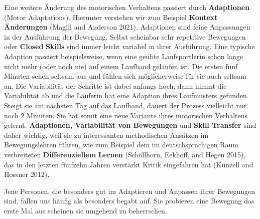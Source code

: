 \documentclass[
  letterpaper,
  DIV=11,
  numbers=noendperiod]{scrreprt}
\begin{document}
Eine weitere Änderung des motorischen Verhaltens passiert durch
\textbf{Adaptionen} (Motor Adaptations). Hierunter verstehen wir zum
Beispiel \textbf{Kontext} \textbf{Änderungen} (Magill and Anderson
2021). Adaptionen sind feine Anpassungen in der Ausführung der Bewegung.
Selbst scheinbar sehr repetitive Bewegungen oder \textbf{Closed}
\textbf{Skills} sind immer leicht variabel in ihrer Ausführung. Eine
typische Adaption passiert beispielsweise, wenn eine geübte
Laufsportlerin schon lange nicht mehr (oder noch nie) auf einem Laufband
gelaufen ist. Die ersten fünf Minuten sehen seltsam aus und fühlen sich
möglicherweise für sie auch seltsam an. Die Variabilität der Schritte
ist dabei anfangs hoch, dann nimmt die Variabilität ab und die Läuferin
hat eine Adaption ihres Laufmusters gefunden. Steigt sie am nächsten Tag
auf das Laufband, dauert der Prozess vielleicht nur noch 2 Minuten. Sie
hat somit eine neue Variante ihres motorischen Verhaltens gelernt.
\textbf{Adaptionen, Variabilität von Bewegungen} und \textbf{Skill
Transfer} sind daher wichtig, weil sie zu interessanten methodischen
Ansätzen im Bewegungslehren führen, wie zum Beispiel dem im
deutschsprachigen Raum verbreiteten \textbf{Differenziellem}
\textbf{Lernen} (Schöllhorn, Eekhoff, and Hegen 2015), das in den
letzten fünfzehn Jahren verstärkt Kritik eingefahren hat (Künzell and
Hossner 2012)\textbf{.}

Jene Personen, die besonders gut im Adaptieren und Anpassen ihrer
Bewegungen sind, fallen uns häufig als besonders begabt auf. Sie
probieren eine Bewegung das erste Mal aus scheinen sie umgehend zu
beherrschen.
\end{document}
